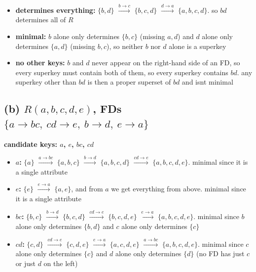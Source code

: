 \documentclass[11pt]{article}
\begin{document}
\begin{itemize}
  \item \textbf{determines everything:} $\{b,d\}$
    $\xrightarrow{b \to c}$ $\{b,c,d\}$
    $\xrightarrow{d \to a}$ $\{a,b,c,d\}$. so $bd$ determines all of $R$
  \item \textbf{minimal:} $b$ alone only determines $\{b,c\}$ (missing
    $a, d$) and $d$ alone only determines $\{a,d\}$ (missing $b, c$), so
    neither $b$ nor $d$ alone is a superkey
  \item \textbf{no other keys:} $b$ and $d$ never appear on the right-hand
    side of an FD, so every superkey must contain both of them, so every
    superkey contains $bd$. any superkey other than $bd$ is then a proper
    superset of $bd$ and isnt minimal
\end{itemize}

\subsection*{(b) $R(a,b,c,d,e)$, FDs $\{a \to bc,\ cd \to e,\ b \to d,\ e \to a\}$}

\noindent\textbf{candidate keys: $a$, $e$, $bc$, $cd$}

\medskip


\begin{itemize}
  \item \textbf{$a$:} $\{a\}$
    $\xrightarrow{a \to bc}$ $\{a,b,c\}$
    $\xrightarrow{b \to d}$ $\{a,b,c,d\}$
    $\xrightarrow{cd \to e}$ $\{a,b,c,d,e\}$.
    minimal since it is a single attribute
  \item \textbf{$e$:} $\{e\}$
    $\xrightarrow{e \to a}$ $\{a,e\}$, and from $a$ we get everything from
    above. minimal since it is a single attribute
  \item \textbf{$bc$:} $\{b,c\}$
    $\xrightarrow{b \to d}$ $\{b,c,d\}$
    $\xrightarrow{cd \to e}$ $\{b,c,d,e\}$
    $\xrightarrow{e \to a}$ $\{a,b,c,d,e\}$.
    minimal since $b$ alone only determines $\{b,d\}$ and $c$ alone only
    determines $\{c\}$
  \item \textbf{$cd$:} $\{c,d\}$
    $\xrightarrow{cd \to e}$ $\{c,d,e\}$
    $\xrightarrow{e \to a}$ $\{a,c,d,e\}$
    $\xrightarrow{a \to bc}$ $\{a,b,c,d,e\}$.
    minimal since $c$ alone only determines $\{c\}$ and $d$ alone only
    determines $\{d\}$ (no FD has just $c$ or just $d$ on the left)
\end{itemize}
\end{document}
